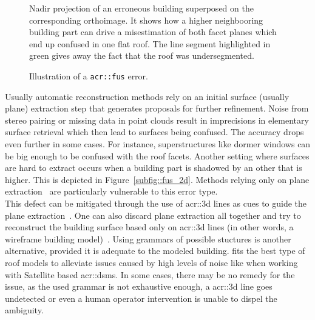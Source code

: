 \begin{figure}[htbp]
{\begin{subfloatrow}
{{                                        \label{subfig::fus_2d}
                                        Nadir projection of an erroneous building superposed on the corresponding orthoimage.
                                        It shows how a higher neighbooring building part can drive a misestimation of both facet planes which end up confused in one flat roof.
                                        The line segment highlighted in green gives away the fact that the roof was undersegmented.
                                    }
                                }
                        \end{subfloatrow}
                    }{
                        \caption{
                            \label{fig::fus}
                            Illustration of a \texttt{\gls{acr::fus}} error.
                        }
                    }
                \end{figure}

                Usually automatic reconstruction methods rely on an initial surface (usually plane) extraction step that generates proposals for further refinement.
                Noise from stereo pairing or missing data in point clouds result in imprecisions in elementary surface retrieval which then lead to surfaces being confused.
                The accuracy drops even further in some cases.
                For instance, superstructures like dormer windows can be big enough to be confused with the roof facets.
                Another setting where surfaces are hard to extract occurs when a building part is shadowed by an other that is higher.
                This is depicted in Figure~\ref{subfig::fus_2d}.
                Methods relying only on plane extraction~\parencite{taillandier2004automatic,durupt2006automatic,nan2017polyfit} are particularly vulnerable to this error type.\\

                This defect can be mitigated through the use of \gls{acr::3d} lines as cues to guide the plane extraction~\parencite{zebedin2008fusion,sinha2009piecewise}.
                One can also discard plane extraction all together and try to reconstruct the building surface based only on \gls{acr::3d} lines (in other words, a wireframe building model)~\parencite{hofer2017efficient,langlois2019surface}.
                Using grammars of possible stuctures is another alternative, provided it is adequate to the modeled building.
                \textcite{lafarge2008structural} fits the best type of roof models to alleviate issues caused by high levels of noise like when working with Satellite based \glspl{acr::dsm}.
                In some cases, there may be no remedy for the issue, as the used grammar is not exhaustive enough, a \gls{acr::3d} line goes undetected or even a human operator intervention is unable to dispel the ambiguity.

